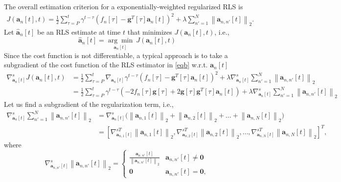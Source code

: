 \documentclass[11pt,final,onecolumn]{IEEEtran}
\begin{document}
\begin{itemize}
\begin{equation}
\end{equation} 
The overall estimation criterion for a exponentially-weighted regularized RLS is
\begin{align} \label{eqb}
J(\bm a_n[t],t)= \frac{1}{2}\sum_{\tau=P}^{t} \gamma ^{t-\tau }\left ( f_n[\tau]- \bm g^T[\tau] \bm a_n[t] \right )^2+\lambda \sum_{n'=1}^{N} \left \lVert \bm a_{n,n'}[t]\right\rVert_2. 
\end{align}
Let $\hat{\bm a}_n[t]$ be an RLS estimate at time $t$ that minimizes $J(\bm a_n[t],t)$, i.e.,
\begin{equation}\label{key}
\hat{\bm a}_n[t]=\underset{\bm a_n[t]}{\arg\min}~J(\bm a_n[t],t)
\end{equation}
Since the cost function is not differentiable, a typical approach is to take a subgradient of the cost function of the RLS estimator in \eqref{eqb}  w.r.t. $\bm a_n[t]$
\begin{align}\label{key}
\nabla_{\bm a_n[t]}^{s}J(\bm a_n[t],t) &= \frac{1}{2}\sum_{\tau=P}^{t} \nabla_{\bm a_n[t]} \gamma ^{t-\tau }\left ( f_n[\tau]- \bm g^T[\tau] \bm a_n[t] \right )^2+\lambda \nabla_{\bm a_n[t]} ^s \sum_{n'=1}^{N} \left \lVert \bm a_{n,n'}[t]\right\rVert_2\\
&= \frac{1}{2}\sum_{\tau=P}^{t} \gamma ^{t-\tau } \left ( -2f_n[\tau]\bm g[\tau]+2\bm g[\tau]\bm g^T[\tau]\bm a_n[t]\right) + \lambda\nabla_{\bm a_n[t]} ^s  \sum_{n'=1}^{N} \left \lVert \bm a_{n,n'}[t]\right\rVert_2
\end{align}
Let us find a subgradient of the regularization term, i.e.,
\begin{align}\label{key}
\nabla_{\bm a_n[t]} ^s \sum_{n'=1}^{N}\left \lVert \bm a_{n,n'}[t]\right\rVert_2 &= \nabla_{\bm a_n[t]} ^s \big (\left \lVert \bm a_{n,1}[t]\right\rVert_2+\left \lVert \bm a_{n,2}[t]\right\rVert_2+ \ldots +\left \lVert \bm a_{n,N}[t]\right\rVert_2 \big ) \\
& =  [ \nabla_{\bm a_{n,1}[t]} ^{sT} \left \lVert \bm a_{n,1}[t]\right\rVert_2, \nabla_{\bm a_{n,2}[t]} ^{sT} \left \lVert \bm a_{n,2}[t]\right\rVert_2, \ldots, \nabla_{\bm a_{n,N}[t]} ^{sT} \left \lVert \bm a_{n,N}[t]\right\rVert_2]^T,
\end{align}
where 
\begin{equation}\label{key}
\nabla_{\bm a_{n,n'}[t]} ^s\left \lVert \bm a_{n,n'}[t]\right\rVert_2= 
\begin{cases}
\frac{\bm a_{n,n'}[t]}{\left \lVert \bm a_{n,n'}[t] \right \rVert_2} & \bm a_{n,n'}[t]\neq \bm 0\\
\bm 0 & \bm a_{n,n'}[t]= \bm 0,

\end{cases}
\end{equation}
\end{itemize}
\end{document}
